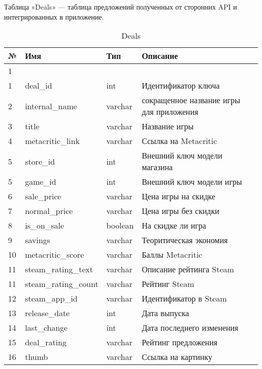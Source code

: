 Таблица «Deals» — таблица предложений полученных от сторонних API и интегрированных в приложение. ~\par
\begin{table}[H]
\caption{Deals}
\label{table:func:deals}
 \centering
 \begin{tabular}
 {| >{\raggedright}m{}
 | >{\centering}m{}
 | >{\centering}m{}
 | >{\centering\arraybackslash}m{}|}
   \hline
   № & Имя & Тип & Описание \\
   \hline
   1 & 2 & 3 & 4 \\
 
   \hline
   1 & deal\_id & int & Идентификатор ключа \\
   \hline
   2 & internal\_name & varchar & сокращенное название игры для приложения \\
   \hline
   3 & title & varchar & Название игры \\
   \hline
   4 & metacritic\_link & varchar & Ссылка на Metacritic \\
   \hline
   5 & store\_id & int & Внешний ключ модели магазина \\
   \hline
   5 & game\_id & int & Внешний ключ модели игры\\
   \hline
   6 & sale\_price & varchar & Цена игры на скидке\\
   \hline
   7 & normal\_price & varchar & Цена игры без скидки\\
   \hline
   8 & is\_on\_sale & boolean & На скидке ли игра\\
   \hline
   9 & savings & varchar & Теоритическая экономия\\
   \hline
   10 & metacritic\_score & varchar & Баллы Metacritic\\
   \hline
   11 & steam\_rating\_text & varchar & Описание рейтинга Steam\\
   \hline
   11 & steam\_rating\_count & varchar & Рейтинг Steam\\
   \hline
   12 & steam\_app\_id & varchar & Идентификатор в Steam\\
   \hline
   13 & release\_date & int & Дата выпуска\\
   \hline
   14 & last\_change & int & Дата последнего изменения\\
   \hline
   15 & deal\_rating & varchar & Рейтинг предложения\\
   \hline
   16 & thumb & varchar & Ссылка на картинку\\
   \hline
 \end{tabular}
\end{table}
